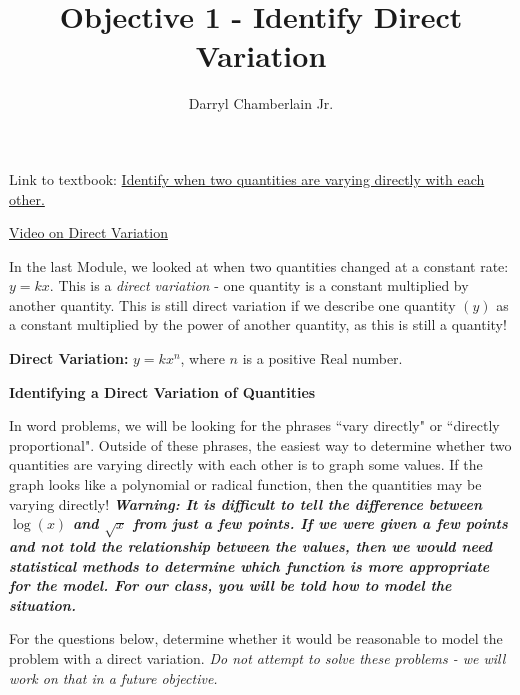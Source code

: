 \documentclass{ximera}
\author{Darryl Chamberlain Jr.}
\title{Objective 1 - Identify Direct Variation}
\begin{document}
\begin{abstract}

\end{abstract}

\maketitle
 
Link to textbook: 
\href{https://cnx.org/contents/mwjClAV_@8.12:yUH0hROr@12/Modeling-Using-Variation}{Identify when two quantities are varying directly with each other.}

\href{https://www.youtube.com/watch?v=WGqmAmzUODM}{Video on Direct Variation}
 

In the last Module, we looked at when two quantities changed at a constant rate: $y=kx$. This is a \textit{direct variation} - one quantity is a constant multiplied by another quantity. This is still direct variation if we describe one quantity $(y)$ as a constant multiplied by the power of another quantity, as this is still a quantity! 

\textbf{Direct Variation:} $y = k x^n$, where $n$ is a positive Real number. 

\textbf{Identifying a Direct Variation of Quantities}

In word problems, we will be looking for the phrases ``vary directly" or ``directly proportional". Outside of these phrases, the easiest way to determine whether two quantities are varying directly with each other is to graph some values. If the graph looks like a polynomial or radical function, then the quantities may be varying directly! \textbf{\textit{Warning: It is difficult to tell the difference between $\log{(x)}$ and $\sqrt{x}$ from just a few points. If we were given a few points and not told the relationship between the values, then we would need statistical methods to determine which function is more appropriate for the model. For our class, you will be told how to model the situation.}} 

For the questions below, determine whether it would be reasonable to model the problem with a direct variation. \textit{Do not attempt to solve these problems - we will work on that in a future objective.}
\end{document}
